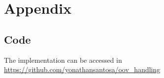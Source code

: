 \documentclass[a4paper,12pt]{report}
\begin{document}
\newpage
{}













\clearpage
{}
{}





\chapter*{Appendix}
\section*{Code}
\label{app:code}
The implementation can be accessed in
\url{https://github.com/yonathansantosa/oov_handling}
\end{document}
